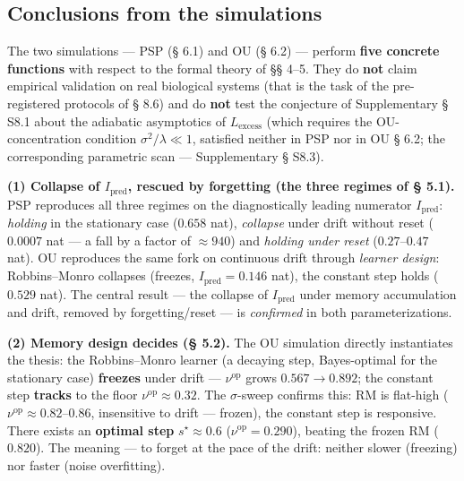 \documentclass[pdflatex,sn-mathphys-ay]{sn-jnl}
\begin{document}
\subsection{Conclusions from the simulations}\label{conclusions-from-the-simulations}



The two simulations --- PSP (§ 6.1) and OU (§ 6.2) --- perform \textbf{five concrete functions} with respect to the formal theory of §§ 4--5. They do \textbf{not} claim empirical validation on real biological systems (that is the task of the pre-registered protocols of § 8.6) and do \textbf{not} test the conjecture of Supplementary § S8.1 about the adiabatic asymptotics of \(L_{\text{excess}}\) (which requires the OU-concentration condition \(\sigma^2/\lambda \ll 1\), satisfied neither in PSP nor in OU § 6.2; the corresponding parametric scan --- Supplementary § S8.3).



\textbf{(1) Collapse of \(I_{\text{pred}}\), rescued by forgetting (the three regimes of § 5.1).} PSP reproduces all three regimes on the diagnostically leading numerator \(I_{\text{pred}}\): \emph{holding} in the stationary case (\(0.658\) nat), \emph{collapse} under drift without reset (\(0.0007\) nat --- a fall by a factor of \(\approx 940\)) and \emph{holding under reset} (\(0.27\)--\(0.47\) nat). OU reproduces the same fork on continuous drift through \emph{learner design}: Robbins--Monro collapses (freezes, \(I_{\text{pred}} = 0.146\) nat), the constant step holds (\(0.529\) nat). The central result --- the collapse of \(I_{\text{pred}}\) under memory accumulation and drift, removed by forgetting/reset --- is \emph{confirmed} in both parameterizations.



\textbf{(2) Memory design decides (§ 5.2).} The OU simulation directly instantiates the thesis: the Robbins--Monro learner (a decaying step, Bayes-optimal for the stationary case) \textbf{freezes} under drift --- \(\nu^{\text{op}}\) grows \(0.567 \to 0.892\); the constant step \textbf{tracks} to the floor \(\nu^{\text{op}} \approx 0.32\). The \(\sigma\)-sweep confirms this: RM is flat-high (\(\nu^{\text{op}} \approx 0.82\)--\(0.86\), insensitive to drift --- frozen), the constant step is responsive. There exists an \textbf{optimal step} \(s^\star \approx 0.6\) (\(\nu^{\text{op}} = 0.290\)), beating the frozen RM (\(0.820\)). The meaning --- to forget at the pace of the drift: neither slower (freezing) nor faster (noise overfitting).
\end{document}
